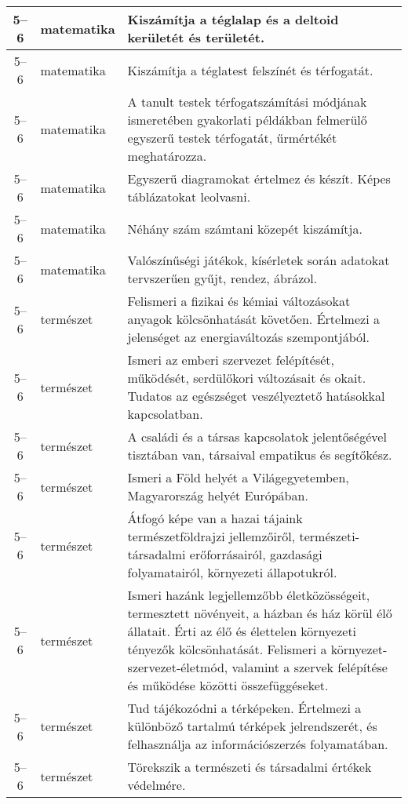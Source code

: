 \begin{small}
\begin{longtable}{c | p{2cm} |  p{11cm} }
              5--6 & matematika & Kiszámítja a téglalap és a deltoid kerületét és területét.
 \\ \hline
              5--6 & matematika & Kiszámítja a téglatest felszínét és térfogatát. \\ \hline
              5--6 & matematika & A tanult testek térfogatszámítási módjának ismeretében gyakorlati példákban felmerülő egyszerű testek térfogatát, űrmértékét meghatározza. \\ \hline
              5--6 & matematika & Egyszerű diagramokat értelmez és  készít. Képes táblázatokat leolvasni.
 \\ \hline
              5--6 & matematika & Néhány szám számtani közepét kiszámítja. \\ \hline
              5--6 & matematika & Valószínűségi játékok, kísérletek során adatokat tervszerűen gyűjt, rendez, ábrázol. \\ \hline
              5--6 & természet & Felismeri a fizikai és kémiai változásokat anyagok kölcsönhatását követően. Értelmezi a jelenséget az energiaváltozás szempontjából. \\ \hline
              5--6 & természet & Ismeri az emberi szervezet felépítését, működését, serdülőkori változásait és okait. Tudatos az egészséget veszélyeztető hatásokkal kapcsolatban. \\ \hline
              5--6 & természet & A családi és a társas kapcsolatok jelentőségével tisztában van, társaival empatikus és segítőkész. \\ \hline
              5--6 & természet & Ismeri a Föld helyét a Világegyetemben, Magyarország helyét Európában. \\ \hline
              5--6 & természet & Átfogó képe van a hazai tájaink természetföldrajzi jellemzőiről, természeti-társadalmi erőforrásairól, gazdasági folyamatairól, környezeti állapotukról. \\ \hline
              5--6 & természet & Ismeri hazánk legjellemzőbb életközösségeit, termesztett növényeit, a házban és ház körül élő állatait. Érti az élő és élettelen környezeti tényezők kölcsönhatását. Felismeri a környezet-szervezet-életmód, valamint a szervek felépítése és működése közötti összefüggéseket. \\ \hline
              5--6 & természet & Tud tájékozódni a térképeken. Értelmezi a különböző tartalmú térképek jelrendszerét, és felhasználja az információszerzés folyamatában. \\ \hline
              5--6 & természet & Törekszik a természeti és társadalmi értékek védelmére. \\ \hline

\end{longtable}
\end{small}
